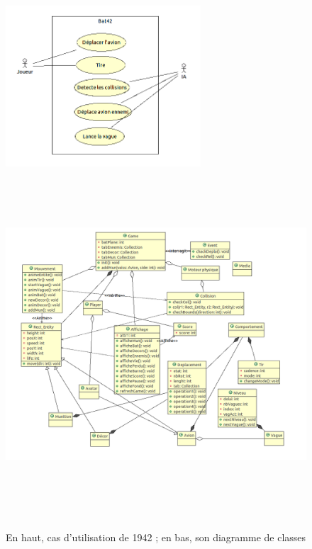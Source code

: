 \begin{figure}[h]
 \centering
 \includegraphics[height=6cm]{../umls/UML_images/Bat42/utilisation} \hfill
 \includegraphics[height=13cm]{../umls/UML_images/Bat42/class} \hfill
 \caption{En haut, cas d'utilisation de 1942 ; en bas, son diagramme de classes}
\end{figure}

